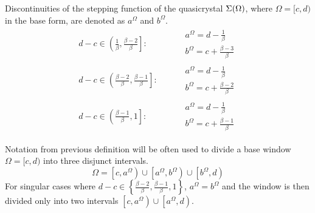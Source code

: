 \documentclass[text.tex]{subfiles}
\begin{document}
\begin{definition}
Discontinuities of the stepping function of the quasicrystal $\Sigma(\Omega)$, where $\Omega = [c,d)$ in the base form, are denoted as $a^\Omega$ and $b^\Omega$. 
\begin{align*}
d-c \in \left( \frac{1}{\beta}, \frac{\beta - 2}{\beta} \right]:& \qquad
		\begin{array}{l}
			a^\Omega = d-\frac{1}{\beta}\\[1mm]
			b^\Omega = c+\frac{\beta - 3}{\beta}
		\end{array}
\\
d-c \in \left( \frac{\beta-2}{\beta}, \frac{\beta-1}{\beta} \right]:& \qquad
		\begin{array}{l}
			a^\Omega = d-\frac{1}{\beta}\\[1mm]
			b^\Omega = c+\frac{\beta - 2}{\beta}
		\end{array}
\\
d-c \in \left( \frac{\beta-1}{\beta}, 1 \right]:& \qquad
		\begin{array}{l}
			a^\Omega = d-\frac{1}{\beta}\\[1mm]
			b^\Omega = c+\frac{\beta - 1}{\beta}
		\end{array}
\end{align*}
\end{definition}

\begin{remark}
Notation from previous definition will be often used to divide a base window $\Omega =  [c,d)$ into three disjunct intervals. 
$$\Omega = \left[c,a^\Omega\right)\cup\left[a^\Omega,b^\Omega\right)\cup\left[b^\Omega,d\right)$$
For singular cases where $d-c\in \left\{ \frac{\beta-2}{\beta}, \frac{\beta-1}{\beta}, 1 \right\}$, $a^\Omega = b^\Omega$ and the window is then divided only into two intervals $\left[c,a^\Omega\right)\cup\left[a^\Omega,d\right)$.
\end{remark}
\end{document}
